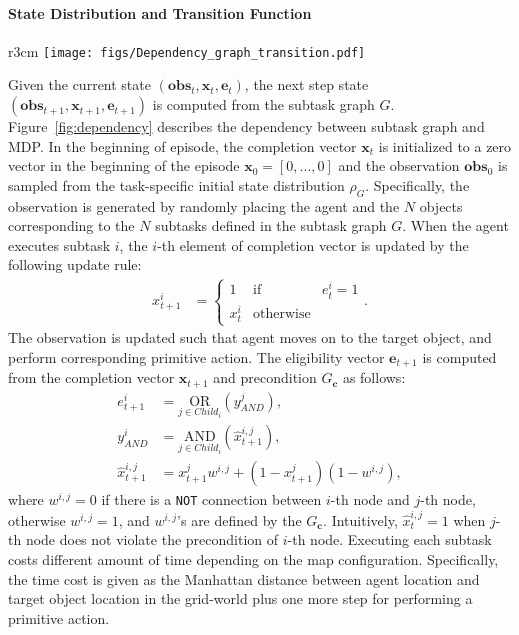 \documentclass{article} \usepackage{iclr2020_conference,times}
\newcommand{\GC}{ G_{\mb{c}} }
\newcommand{\mb}{\mathbf}
\newcommand{\cutparagraphup}{\vspace{-2pt}}
\begin{document}
\paragraph{State Distribution and Transition Function} 
\begin{wrapfigure}{r}{3cm}
\centering
  \vspace*{-15pt}
  \texttt{[image: figs/Dependency\_graph\_transition.pdf]}
  \vspace*{-17pt}
  \caption{Dependency between subtask graph and MDP}
  \label{fig:dependency}
  \vspace*{-15pt}
\end{wrapfigure}
Given the current state $(\mb{obs}_t, \mb{x}_t, \mb{e}_t)$, the next step state $(\mb{obs}_{t+1}, \mb{x}_{t+1}, \mb{e}_{t+1})$ is computed from the subtask graph $G$. Figure~\ref{fig:dependency} describes the dependency between subtask graph and MDP. In the beginning of episode, the completion vector $\mb{x}_t$ is initialized to a zero vector in the beginning of the episode $\mb{x}_0=[0,\ldots,0]$ and the observation $\mb{obs}_0$ is sampled from the task-specific initial state distribution $\rho_{G}$. Specifically, the observation is generated by randomly placing the agent and the $N$ objects corresponding to the $N$ subtasks defined in the subtask graph $G$. When the agent executes subtask $i$, the $i$-th element of completion vector is updated by the following update rule:
\begin{align}
    x^i_{t+1} &=\left\{ \begin{array}{rcl}
1 & \mbox{if} & e_t^i=1 \\ 
x^i_t & \mbox{otherwise} & 
\end{array}\right..
\end{align}
The observation is updated such that agent moves on to the target object, and perform corresponding primitive action. The eligibility vector $\mb{e}_{t+1}$ is computed from the completion vector $\mb{x}_{t+1}$ and precondition $\GC{}$ as follows:
\begin{align}
  e_{t+1}^{i} &= \underset{j\in Child_i}{\text{OR}} \left( y^{j}_{AND}\right),\\
  y^{i}_{AND} &= \underset{j\in Child_i}{\text{AND}} \left( \widehat{x}_{t+1}^{i,j}\right),\\
  \widehat{x}_{t+1}^{i,j}&= x_{t+1}^jw^{i,j} + (1-x_{t+1}^j)(1-w^{i,j}),
  \label{eq:xhat-sup}
\end{align}
where $w^{i, j}=0$ if there is a \texttt{NOT} connection between $i$-th node and $j$-th node, otherwise $w^{i,j}=1$, and $w^{i, j}$'s are defined by the $\GC{}$. Intuitively, $\widehat{x}_{t}^{i,j}=1$ when $j$-th node does not violate the precondition of $i$-th node. Executing each subtask costs different amount of time depending on the map configuration. Specifically, the time cost is given as the Manhattan distance between agent location and target object location in the grid-world plus one more step for performing a primitive action. 
\cutparagraphup
\end{document}

